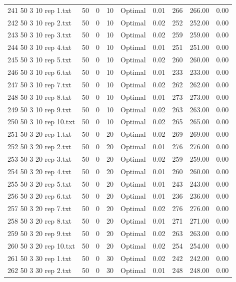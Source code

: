 \begin{longtable}{lrrllrrrr}
241 50 3 10 rep 1.txt & 50 & 0 & 10 & Optimal &  0.01 & 266 & 266.00 &  0.00\\
242 50 3 10 rep 2.txt & 50 & 0 & 10 & Optimal &  0.02 & 252 & 252.00 &  0.00\\
243 50 3 10 rep 3.txt & 50 & 0 & 10 & Optimal &  0.02 & 259 & 259.00 &  0.00\\
244 50 3 10 rep 4.txt & 50 & 0 & 10 & Optimal &  0.01 & 251 & 251.00 &  0.00\\
245 50 3 10 rep 5.txt & 50 & 0 & 10 & Optimal &  0.02 & 260 & 260.00 &  0.00\\
246 50 3 10 rep 6.txt & 50 & 0 & 10 & Optimal &  0.01 & 233 & 233.00 &  0.00\\
247 50 3 10 rep 7.txt & 50 & 0 & 10 & Optimal &  0.02 & 262 & 262.00 &  0.00\\
248 50 3 10 rep 8.txt & 50 & 0 & 10 & Optimal &  0.01 & 273 & 273.00 &  0.00\\
249 50 3 10 rep 9.txt & 50 & 0 & 10 & Optimal &  0.02 & 263 & 263.00 &  0.00\\
250 50 3 10 rep 10.txt & 50 & 0 & 10 & Optimal &  0.02 & 265 & 265.00 &  0.00\\
251 50 3 20 rep 1.txt & 50 & 0 & 20 & Optimal &  0.02 & 269 & 269.00 &  0.00\\
252 50 3 20 rep 2.txt & 50 & 0 & 20 & Optimal &  0.01 & 276 & 276.00 &  0.00\\
253 50 3 20 rep 3.txt & 50 & 0 & 20 & Optimal &  0.02 & 259 & 259.00 &  0.00\\
254 50 3 20 rep 4.txt & 50 & 0 & 20 & Optimal &  0.01 & 260 & 260.00 &  0.00\\
255 50 3 20 rep 5.txt & 50 & 0 & 20 & Optimal &  0.01 & 243 & 243.00 &  0.00\\
256 50 3 20 rep 6.txt & 50 & 0 & 20 & Optimal &  0.01 & 236 & 236.00 &  0.00\\
257 50 3 20 rep 7.txt & 50 & 0 & 20 & Optimal &  0.02 & 276 & 276.00 &  0.00\\
258 50 3 20 rep 8.txt & 50 & 0 & 20 & Optimal &  0.01 & 271 & 271.00 &  0.00\\
259 50 3 20 rep 9.txt & 50 & 0 & 20 & Optimal &  0.02 & 263 & 263.00 &  0.00\\
260 50 3 20 rep 10.txt & 50 & 0 & 20 & Optimal &  0.02 & 254 & 254.00 &  0.00\\
261 50 3 30 rep 1.txt & 50 & 0 & 30 & Optimal &  0.02 & 242 & 242.00 &  0.00\\
262 50 3 30 rep 2.txt & 50 & 0 & 30 & Optimal &  0.01 & 248 & 248.00 &  0.00\\

\end{longtable}
